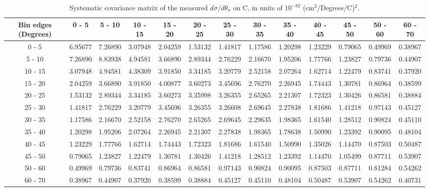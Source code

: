 \documentclass[aps,prl,twocolumn,superscriptaddress,nofootinbib]{revtex4-1}
\begin{document}
\begin{turnpage}
 \begin{table}[h!]
  \centering
  \caption{Systematic covariance matrix of the measured $d\sigma/d\theta_{\pi}$ on C, in units of $10^{-82}$ (cm$^{2}$/Degrees/C)$^{2}$.}
    \begin{tabular}{c||cccccccccccc}
      Bin edges (Degrees) & 0 - 5 & 5 - 10 & 10 - 15 & 15 - 20 & 20 - 25 & 25 - 30 & 30 - 35 & 35 - 40 & 40 - 45 & 45 - 50 & 50 - 60 & 60 - 70 \\
\hline \hline
        0 - 5 &  6.95677 &  7.26890 &  3.07948 &  2.04259 &  1.53132 &  1.41817 &  1.17586 &  1.20298 &  1.23229 &  0.79065 &  0.49969 &  0.38967 \\
       5 - 10 &  7.26890 &  8.83938 &  4.94581 &  3.66890 &  2.89344 &  2.76229 &  2.16670 &  1.95206 &  1.77766 &  1.23827 &  0.79736 &  0.44907 \\
      10 - 15 &  3.07948 &  4.94581 &  4.38309 &  3.91850 &  3.34185 &  3.20779 &  2.52158 &  2.07264 &  1.62714 &  1.22479 &  0.83741 &  0.37920 \\
      15 - 20 &  2.04259 &  3.66890 &  3.91850 &  4.00877 &  3.60273 &  3.45696 &  2.76270 &  2.26945 &  1.74443 &  1.30781 &  0.86964 &  0.38599 \\
      20 - 25 &  1.53132 &  2.89344 &  3.34185 &  3.60273 &  3.35998 &  3.26355 &  2.65265 &  2.21307 &  1.72323 &  1.30426 &  0.86581 &  0.38884 \\
      25 - 30 &  1.41817 &  2.76229 &  3.20779 &  3.45696 &  3.26355 &  3.26608 &  2.69645 &  2.27838 &  1.81686 &  1.41218 &  0.97143 &  0.45127 \\
      30 - 35 &  1.17586 &  2.16670 &  2.52158 &  2.76270 &  2.65265 &  2.69645 &  2.29635 &  1.98365 &  1.61540 &  1.28512 &  0.90824 &  0.45110 \\
      35 - 40 &  1.20298 &  1.95206 &  2.07264 &  2.26945 &  2.21307 &  2.27838 &  1.98365 &  1.78638 &  1.50990 &  1.23392 &  0.90095 &  0.48104 \\
      40 - 45 &  1.23229 &  1.77766 &  1.62714 &  1.74443 &  1.72323 &  1.81686 &  1.61540 &  1.50990 &  1.35026 &  1.14470 &  0.87503 &  0.50487 \\
      45 - 50 &  0.79065 &  1.23827 &  1.22479 &  1.30781 &  1.30426 &  1.41218 &  1.28512 &  1.23392 &  1.14470 &  1.05499 &  0.87711 &  0.53907 \\
      50 - 60 &  0.49969 &  0.79736 &  0.83741 &  0.86964 &  0.86581 &  0.97143 &  0.90824 &  0.90095 &  0.87503 &  0.87711 &  0.81284 &  0.54262 \\
      60 - 70 &  0.38967 &  0.44907 &  0.37920 &  0.38599 &  0.38884 &  0.45127 &  0.45110 &  0.48104 &  0.50487 &  0.53907 &  0.54262 &  0.40731 \\
    \end{tabular}
  \label{tablecov:C_Systematic_ThetaPi}
  \end{table}
\end{turnpage}
\end{document}
